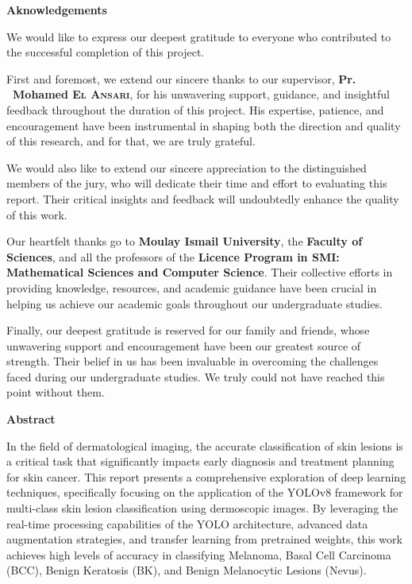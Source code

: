 \documentclass[a4paper,12pt]{report}
\begin{document}
\newpage
\begin{spacing}{1.5}
     \begin{center}
         \textbf{\huge Aknowledgements}
     \end{center}

    We would like to express our deepest gratitude to everyone who contributed to the successful completion of this project.

    First and foremost, we extend our sincere thanks to our supervisor, \textbf{Pr. ~Mohamed \textsc{El Ansari}}, for his unwavering support, guidance, and insightful feedback throughout the duration of this project. His expertise, patience, and encouragement have been instrumental in shaping both the direction and quality of this research, and for that, we are truly grateful.

    We would also like to extend our sincere appreciation to the distinguished members of the jury, who will dedicate their time and effort to evaluating this report. Their critical insights and feedback will undoubtedly enhance the quality of this work.

    Our  heartfelt thanks go to \textbf{Moulay Ismail University}, the \textbf{Faculty of Sciences}, and all the professors of the \textbf{Licence Program in SMI: Mathematical Sciences and Computer Science}. Their collective efforts in providing knowledge, resources, and academic guidance have been crucial in helping us achieve our academic goals throughout our undergraduate studies.

    Finally, our deepest gratitude is reserved for our family and friends, whose unwavering support and encouragement have been our greatest source of strength. Their belief in us has been invaluable in overcoming the challenges faced during our undergraduate studies. We truly could not have reached this point without them.

    \newpage
    \begin{center}
        \textbf{\huge Abstract}
    \end{center}
    
    In the field of dermatological imaging, the accurate classification of skin lesions is a critical task that significantly impacts early diagnosis and treatment planning for skin cancer. This report presents a comprehensive exploration of deep learning techniques, specifically focusing on the application of the YOLOv8 framework for multi-class skin lesion classification using dermoscopic images. By leveraging the real-time processing capabilities of the YOLO architecture, advanced data augmentation strategies, and transfer learning from pretrained weights, this work achieves high levels of accuracy in classifying Melanoma, Basal Cell Carcinoma (BCC), Benign Keratosis (BK), and Benign Melanocytic Lesions (Nevus).
    

\end{spacing}
\end{document}
